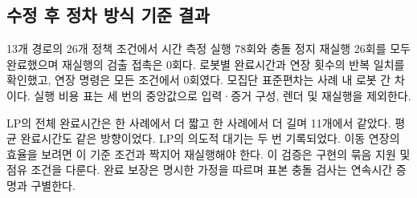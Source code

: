 \documentclass[11pt,a4paper]{article}
\theoremstyle{remark}
\begin{document}
\subsection{수정 후 정차 방식 기준 결과}
13개 경로의 26개 정책 조건에서 시간 측정 실행 78회와 충돌 정지 재실행 26회를 모두 완료했으며 재실행의 검출 접촉은 0회다. 로봇별 완료시간과 연장 횟수의 반복 일치를 확인했고, 연장 명령은 모든 조건에서 0회였다. 모집단 표준편차는 사례 내 로봇 간 차이다. 실행 비용 표는 세 번의 중앙값으로 입력·증거 구성, 렌더 및 재실행을 제외한다.

LP의 전체 완료시간은 한 사례에서 더 짧고 한 사례에서 더 길며 11개에서 같았다. 평균 완료시간도 같은 방향이었다. LP의 의도적 대기는 두 번 기록되었다. 이동 연장의 효율을 보려면 이 기준 조건과 짝지어 재실행해야 한다. 이 검증은 구현의 묶음 지원 및 점유 조건을 다룬다. 완료 보장은 명시한 가정을 따르며 표본 충돌 검사는 연속시간 증명과 구별한다.
\end{document}
